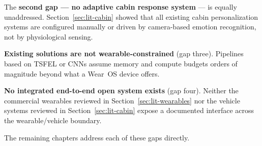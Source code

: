 The \textbf{second gap --- no adaptive cabin response system} ---
is equally unaddressed. Section~\ref{sec:lit-cabin} showed that all
existing cabin personalization systems are configured manually or
driven by camera-based emotion recognition, not by physiological
sensing.

\textbf{Existing solutions are not wearable-constrained} (gap three).
Pipelines based on TSFEL \citep{barandas2020tsfel} or CNNs
\citep{can2019stress} assume memory and compute budgets orders of
magnitude beyond what a Wear~OS device offers.

\textbf{No integrated end-to-end open system exists} (gap four).
Neither the commercial wearables reviewed in Section~\ref{sec:lit-wearables}
nor the vehicle systems reviewed in Section~\ref{sec:lit-cabin}
expose a documented interface across the wearable/vehicle boundary.

The remaining chapters address each of these gaps directly.
